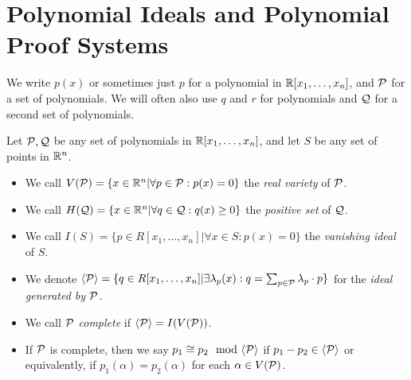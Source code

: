 \section{Polynomial Ideals and Polynomial Proof Systems}\label{sec:polyproofs}
We write $p(x)$ or sometimes just $p$ for a polynomial in $\mathbb R[x_1,\dots,x_n]$, and $\mathcal P$ for a set of polynomials.
We will often also use $q$ and $r$ for polynomials and $\mathcal Q$ for a second set of polynomials. 
\begin{definition}
Let $\mathcal P,\mathcal Q$ be any set of polynomials in $\mathbb R[x_1,\dots,x_n]$, and let $S$ be any set of points in $\mathbb R^n$.
\begin{itemize}
\item We call $V(\mathcal P) = \{x \in \mathbb R^n | \forall p \in \mathcal P: p(x) = 0\}$ the \emph{real variety} of $\mathcal P$. 
\item We call $H(\mathcal Q) = \{x \in \mathbb R^n | \forall q \in \mathcal Q: q(x) \geq 0\}$ the \emph{positive set} of $\mathcal Q$.
\item We call $I(S) = \{p \in R[x_1,\dots,x_n] | \forall x \in S: p(x) = 0\}$ the \emph{vanishing ideal} of $S$.
\item We denote $\langle \mathcal P \rangle = \{q \in R[x_1,\dots,x_n] | \exists \lambda_p(x): q = \sum_{p \in \mathcal P} \lambda_p \cdot p\}$ for the \emph{ideal generated by $\mathcal P$}.
\item We call $\mathcal P$ \emph{complete} if $\langle \mathcal P \rangle = I(V(\mathcal P))$.
\item If $\mathcal P$ is complete, then we say $p_1 \cong p_2 \mod \gen{\cP}$ if $p_1 - p_2 \in \langle \mathcal P \rangle$ or equivalently, if $p_1(\alpha) = p_2(\alpha)$ for each $\alpha \in V(\mathcal P)$.
\end{itemize}
\end{definition}

